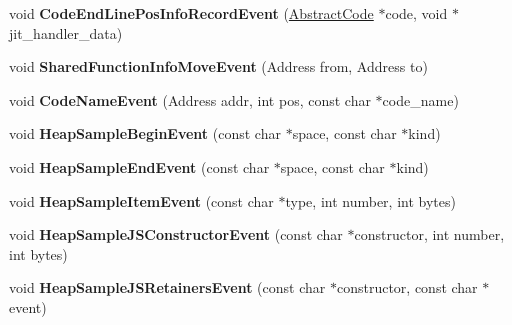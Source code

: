 \begin{DoxyCompactItemize}
\item 
void {\bfseries Code\+End\+Line\+Pos\+Info\+Record\+Event} (\hyperlink{classv8_1_1internal_1_1_abstract_code}{Abstract\+Code} $\ast$code, void $\ast$jit\+\_\+handler\+\_\+data)\hypertarget{classv8_1_1internal_1_1_logger_a2ad88e3fabd9ed9452ab4b93f2b62e8f}{}\label{classv8_1_1internal_1_1_logger_a2ad88e3fabd9ed9452ab4b93f2b62e8f}

\item 
void {\bfseries Shared\+Function\+Info\+Move\+Event} (Address from, Address to)\hypertarget{classv8_1_1internal_1_1_logger_a553a061808106090e143385055763096}{}\label{classv8_1_1internal_1_1_logger_a553a061808106090e143385055763096}

\item 
void {\bfseries Code\+Name\+Event} (Address addr, int pos, const char $\ast$code\+\_\+name)\hypertarget{classv8_1_1internal_1_1_logger_a25ef7751705623af5cb5aedfa447efb1}{}\label{classv8_1_1internal_1_1_logger_a25ef7751705623af5cb5aedfa447efb1}

\item 
void {\bfseries Heap\+Sample\+Begin\+Event} (const char $\ast$space, const char $\ast$kind)\hypertarget{classv8_1_1internal_1_1_logger_af234de8800ae099ac496877d3383166a}{}\label{classv8_1_1internal_1_1_logger_af234de8800ae099ac496877d3383166a}

\item 
void {\bfseries Heap\+Sample\+End\+Event} (const char $\ast$space, const char $\ast$kind)\hypertarget{classv8_1_1internal_1_1_logger_ac5d04cbc5bda7d5ab0d3cc5533693fd0}{}\label{classv8_1_1internal_1_1_logger_ac5d04cbc5bda7d5ab0d3cc5533693fd0}

\item 
void {\bfseries Heap\+Sample\+Item\+Event} (const char $\ast$type, int number, int bytes)\hypertarget{classv8_1_1internal_1_1_logger_a22aac49c20fbf307ae82612c6df36617}{}\label{classv8_1_1internal_1_1_logger_a22aac49c20fbf307ae82612c6df36617}

\item 
void {\bfseries Heap\+Sample\+J\+S\+Constructor\+Event} (const char $\ast$constructor, int number, int bytes)\hypertarget{classv8_1_1internal_1_1_logger_a18eb1c23722508fbbd8ba64951ccd677}{}\label{classv8_1_1internal_1_1_logger_a18eb1c23722508fbbd8ba64951ccd677}

\item 
void {\bfseries Heap\+Sample\+J\+S\+Retainers\+Event} (const char $\ast$constructor, const char $\ast$event)\hypertarget{classv8_1_1internal_1_1_logger_a322eebc4f841da47ae4392d7fd452f97}{}\label{classv8_1_1internal_1_1_logger_a322eebc4f841da47ae4392d7fd452f97}


\end{DoxyCompactItemize}
